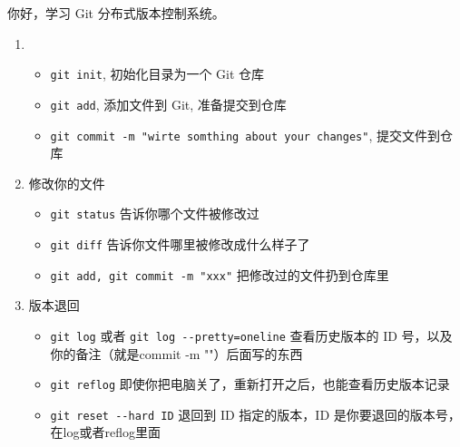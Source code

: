 \documentclass[UTF8]{ctexart}
\begin{document}
你好，学习 Git 分布式版本控制系统。\par
\begin{enumerate}
  \item
  \begin{itemize}
    \item \verb|git init|, 初始化目录为一个 Git 仓库
    \item \verb|git add|, 添加文件到 Git, 准备提交到仓库
    \item \verb|git commit -m "wirte somthing about your changes"|, 提交文件到仓库
  \end{itemize}
  \item 修改你的文件
  \begin{itemize}
    \item \verb|git status| 告诉你哪个文件被修改过
    \item \verb|git diff| 告诉你文件哪里被修改成什么样子了
    \item \verb|git add, git commit -m "xxx"| 把修改过的文件扔到仓库里
  \end{itemize}
  \item 版本退回
  \begin{itemize}
    \item \verb|git log| 或者 \verb|git log --pretty=oneline| 查看历史版本的 ID 号，以及你的备注（就是commit -m ""）后面写的东西
    \item \verb|git reflog| 即使你把电脑关了，重新打开之后，也能查看历史版本记录
    \item \verb|git reset --hard ID| 退回到 ID 指定的版本，ID 是你要退回的版本号，在log或者reflog里面
  \end{itemize}
\end{enumerate}
\end{document}
